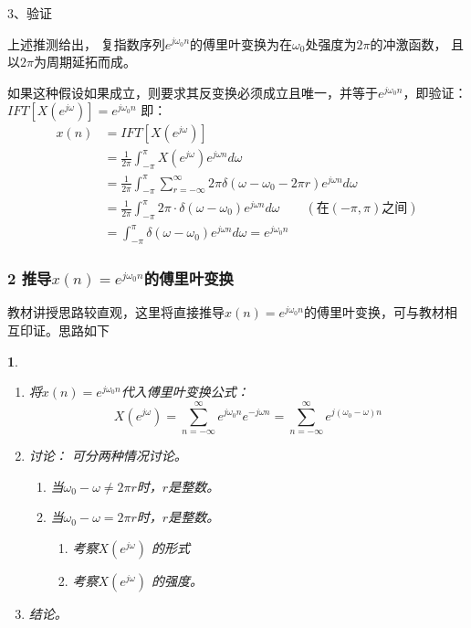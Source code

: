 \documentclass[notheorems,compress,mathserif,table]{beamer}
\newtheorem{dablock}{}
\begin{document}
\begin{frame}[shrink]\frametitle{}%
3、验证\par
\qquad 上述推测给出，
复指数序列$e^{j\omega_{0}n}$的傅里叶变换为在$\omega_{0}$处强度为$2\pi$的冲激函数，
且以$2\pi$为周期延拓而成。

\qquad 如果这种假设如果成立，则要求其反变换必须成立且唯一，并等于$e^{j\omega_{0}n}$，即验证：
$IFT[X(e^{j\omega})] = e^{j\omega_0 n}$
即：
\begin{equation*}
\begin{split}
x(n) &= IFT[X(e^{j\omega})] \\
&= \frac{1}{2\pi}\int_{-\pi}^{\pi}X(e^{j\omega})e^{j\omega n}d\omega\\
&= \frac{1}{2\pi}\int_{-\pi}^{\pi}\sum_{r=-\infty}^{\infty}2\pi\delta(\omega-\omega_{0}-2\pi r)e^{j\omega n}d\omega\\
&= \frac{1}{2\pi}\int_{-\pi}^{\pi}2\pi\cdot \delta(\omega-\omega_{0})e^{j\omega n}d\omega \qquad(\mbox{在$(-\pi,\pi)$之间})\\
&= \int_{-\pi}^{\pi}\delta(\omega-\omega_{0})e^{j\omega n}d\omega = e^{j\omega_0 n}
\end{split}
\end{equation*}

\end{frame}



\begin{frame}[shrink]\frametitle{2 推导$x(n)=e^{j\omega_0 n}$的傅里叶变换}%

教材讲授思路较直观，这里将直接推导$x(n)=e^{j\omega_0 n}$的傅里叶变换，可与教材相互印证。思路如下
\begin{dablock}
\begin{enumerate}
\item [(1)] 将$x(n)=e^{j\omega_0 n}$代入傅里叶变换公式：
$$X(e^{j\omega})= \sum_{n=-\infty}^{\infty}e^{j\omega_{0}n}e^{-j\omega n}
= \sum_{n=-\infty}^{\infty}e^{j(\omega_{0}-\omega) n}
$$
\item [(2)] 讨论：%
可分两种情况讨论。
\begin{enumerate}
\item [(a)] 当$\omega_{0}-\omega\neq 2\pi r$时，$r$是整数。
\item [(b)] 当$\omega_{0}-\omega= 2\pi r$时，$r$是整数。
\begin{enumerate}
\item 考察$X(e^{j\omega})$ 的形式
\item 考察$X(e^{j\omega})$ 的强度。
\end{enumerate}
\end{enumerate}
\item [(3)] 结论。
\end{enumerate}
\end{dablock}
\end{frame}
\end{document}
